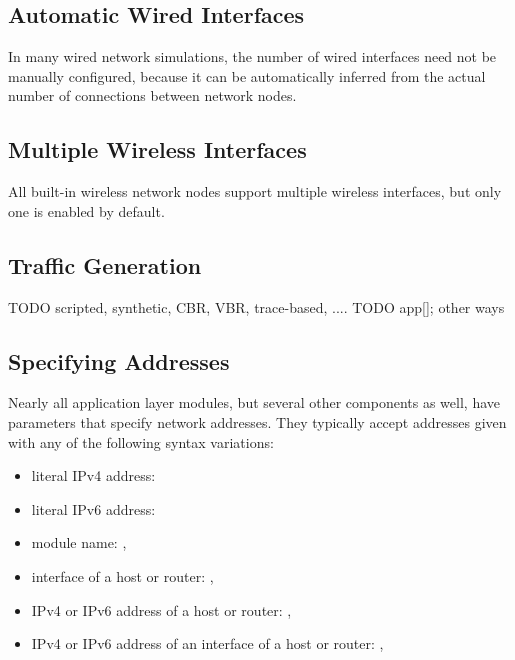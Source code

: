 \subsection{Automatic Wired Interfaces}

In many wired network simulations, the number of wired interfaces need not
be manually configured, because it can be automatically inferred from the
actual number of connections between network nodes.


\subsection{Multiple Wireless Interfaces}

All built-in wireless network nodes support multiple wireless interfaces,
but only one is enabled by default.


\subsection{Traffic Generation}

TODO scripted, synthetic, CBR, VBR, trace-based, .... 
TODO app[]; other ways 

\subsection{Specifying Addresses}

Nearly all application layer modules, but several other components as well,
have parameters that specify network addresses. They typically accept
addresses given with any of the following syntax variations:

\begin{itemize}
  \item literal IPv4 address: 
  \item literal IPv6 address: 
  \item module name: , 
  \item interface of a host or router: , 
  \item IPv4 or IPv6 address of a host or router: ,
  \item IPv4 or IPv6 address of an interface of a host or router:
      , 
\end{itemize}


